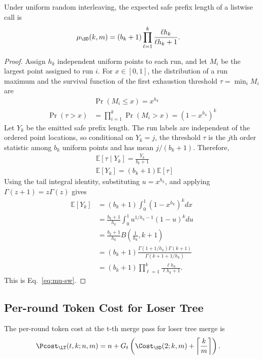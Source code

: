 \begin{theorem}
Under uniform random interleaving, the expected safe prefix length of a listwise call is
\begin{align}
  \mu_{\SD}(k,m)
  &=(b_k+1)\prod_{\ell=1}^{k}
    \frac{\ell h_k}{\ell h_k+1}.
\end{align}
\end{theorem}

\begin{proof}
Assign $h_k$ independent uniform points to each run, and let $M_i$ be the largest point assigned to run $i$. For $x\in[0,1]$, the distribution of a run maximum and the survival function of the first exhaustion threshold $\tau=\min_i M_i$ are
\begin{align}
  &\Pr(M_i\le x) = x^{h_k}\\
  \Pr(\tau>x) &= \prod_{i=1}^{k}\Pr(M_i>x)=(1-x^{h_k})^k
\end{align}
Let $Y_k$ be the emitted safe prefix length. The run labels are independent of the ordered point locations, so conditional on $Y_k=j$, the threshold $\tau$ is the $j$th order statistic among $b_k$ uniform points and has mean $j/(b_k+1)$. Therefore,
\begin{align}
  &\mathbb E[\tau\mid Y_k] =\frac{Y_k}{b_k+1}\\
  &\mathbb E[Y_k] =(b_k+1)\mathbb E[\tau]
\end{align}
Using the tail integral identity, substituting $u=x^{h_k}$, and applying $\Gamma(z+1)=z\Gamma(z)$ gives
\begin{align}
  \mathbb E[Y_k]
  &=(b_k+1)\int_0^1(1-x^{h_k})^kdx
  \nonumber\\
  &=\frac{b_k+1}{h_k}
    \int_0^1u^{1/h_k-1}(1-u)^kdu
    \nonumber\\
  &=\frac{b_k+1}{h_k}
    B\!\left(\frac1{h_k},k+1\right)
    \nonumber\\
  &=(b_k+1)
    \frac{\Gamma(1+1/h_k)\Gamma(k+1)}
         {\Gamma(k+1+1/h_k)}
    \nonumber\\
  &=(b_k+1)\prod_{\ell=1}^{k}
    \frac{\ell h_k}{\ell h_k+1}.
\end{align}
This is Eq.~\eqref{eq:mu-sw}.
\end{proof}

\subsection{Per-round Token Cost for Loser Tree}

\begin{proposition}
The per-round token cost at the t-th merge pass for loser tree merge is
\begin{align}
  \Pcost_{\LT}(t,k;n,m)
  &=n+G_t\left(
      \Cost_{\SD}(2;k,m)
      +\left\lceil\frac{k}{m}\right\rceil
    \right).
\end{align}
\end{proposition}

